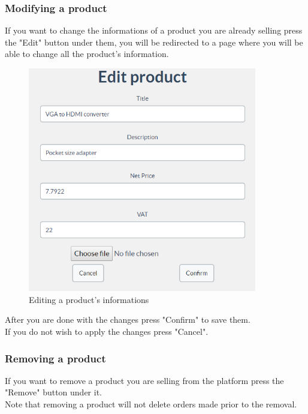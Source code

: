 	\subsubsection{Modifying a product}
	If you want to change the informations of a product you are already selling press 
	the "Edit" button under them, you will be redirected to a page where you 
	will be able to change all the product's information.
	\begin{figure}[H]
		\includegraphics[width=10cm]{res/images/edit_product.png}
		\centering
		\caption{Editing a product's informations}
	\end{figure}
	\noindent After you are done with the changes press "Confirm" to save them.
	\\If you do not wish to apply the changes press "Cancel".
	
	\subsubsection{Removing a product}
	If you want to remove a product you are selling from the platform press the
	"Remove" button under it.
	\\Note that removing a product will not delete orders made prior to the 
	removal. 
	
